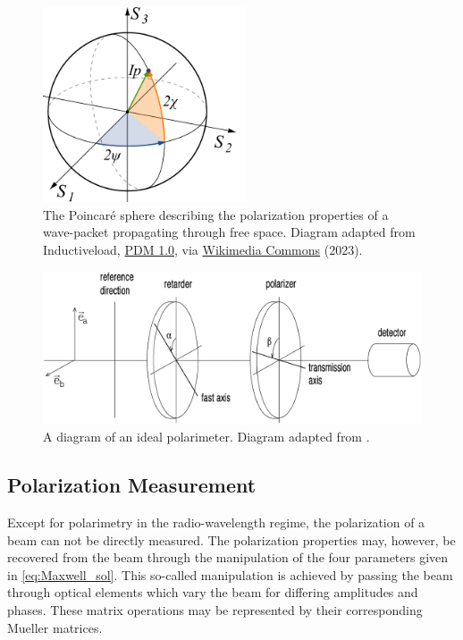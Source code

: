 \begin{figure}[t]
    \centering
    \includegraphics[width=6cm]{figures/2_poincare_sphere.pdf}
    \caption{The Poincar{\'e} sphere describing the polarization properties of a wave-packet propagating through free space. Diagram adapted from Inductiveload, \protect\href{https://creativecommons.org/publicdomain/mark/1.0/}{PDM 1.0}, via \protect\href{https://commons.wikimedia.org/wiki/File:Poincaré_sphere.svg}{Wikimedia Commons} (2023).}
    \label{fig:poincare}
\end{figure}


\begin{figure}[t]
    \centering
    \includegraphics[width=1\textwidth]{figures/2_polarimeter.pdf}
    \caption{A diagram of an ideal polarimeter. Diagram adapted from \cite{pol_in_spectra}.}
    \label{fig:polarimeter}
\end{figure}

\subsection{Polarization Measurement}\label{subsec:pol_measure}

Except for polarimetry in the radio-wavelength regime, the polarization of a beam can not be directly measured. The polarization properties may, however, be recovered from the beam through the manipulation of the four parameters given in \autoref{eq:Maxwell_sol}. This so-called manipulation is achieved by passing the beam through optical elements which vary the beam for differing amplitudes and phases. These matrix operations may be represented by their corresponding Mueller matrices.

